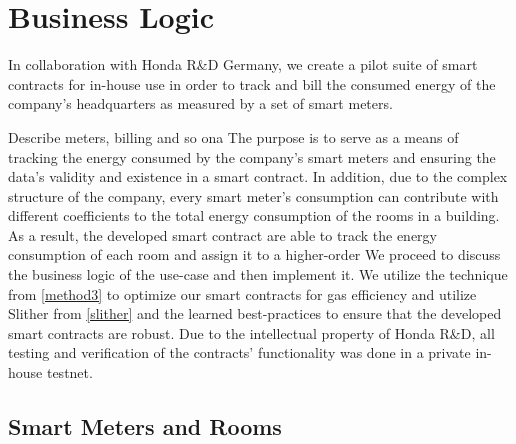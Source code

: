 
\section{Business Logic}
In collaboration with Honda R\&D Germany, we create a pilot suite of smart contracts for in-house use in order to track and bill the consumed energy of the company's headquarters as measured by a set of smart meters. 

Describe meters, billing and so ona
The purpose is to serve as a means of tracking the energy consumed by the company's smart meters and ensuring the data's validity and existence in a smart contract. In addition, due to the complex structure of the company, every smart meter's consumption can contribute with different coefficients to the total energy consumption of the rooms in a building. As a result, the developed smart contract are able to track the energy consumption of each room and assign it to a higher-order 
We proceed to discuss the business logic of the use-case and then implement it. We utilize the technique from \ref{method3} to optimize our smart contracts for gas efficiency and utilize Slither from \ref{slither} and the learned best-practices to ensure that the developed smart contracts are robust. Due to the intellectual property of Honda R\&D, all testing and verification of the contracts' functionality was done in a private in-house testnet.


\subsection{Smart Meters and Rooms}

